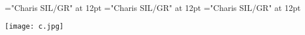 \documentclass[a4paper]{article}
\begin{document}
\pagestyle{plain}
\sloppy
\setlength{\parfillskip}{0pt plus 1fil}
\font\entrydicBody="Charis SIL/GR" at 12pt
\font\pictureRightentrydicBody="Charis SIL/GR" at 12pt
\font\picturepictureRightentrydicBody="Charis SIL/GR" at 12pt

\mbox{} 
\newpage 
\newpage 
\setcounter{page}{1} 
\pagestyle{fancy} 


\begin{center}
\texttt{[image: c.jpg]} 
\end{center}
\end{document}
